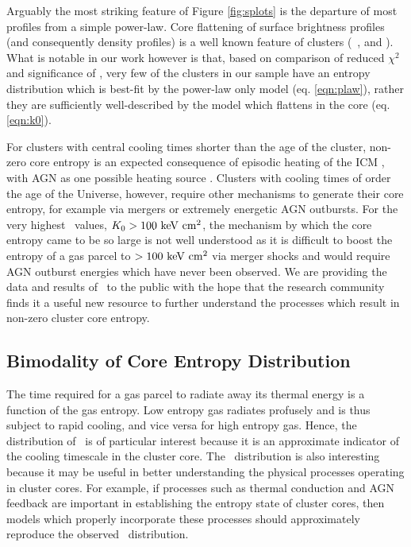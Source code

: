 \documentclass[12pt,preprint]{aastex}
\begin{document}
Arguably the most striking feature of Figure \ref{fig:splots} is the
departure of most profiles from a simple power-law. Core flattening of
surface brightness profiles (and consequently density profiles) is a
well known feature of clusters (\eg\ \citealt{1984ApJ...276...38J},
\citealt{1999ApJ...517..627M} and \citealt{2000MNRAS.318..715X}). What
is notable in our work however is that, based on comparison of reduced
$\chi^2$ and significance of \kna, very few of the clusters in our
sample have an entropy distribution which is best-fit by the power-law
only model (eq. \ref{eqn:plaw}), rather they are sufficiently
well-described by the model which flattens in the core
(eq. \ref{eqn:k0}).

For clusters with central cooling times shorter than the age of the
cluster, non-zero core entropy is an expected consequence of episodic
heating of the ICM \citep{agnframework}, with AGN as one possible
heating source \citep{1997MNRAS.288..355B, 2000ApJ...532...17L,
2001Natur.414..425V, 2001ApJ...549..832S, 2002MNRAS.332..729C,
2002Natur.418..301B, 2002MNRAS.331..545B, 2002MNRAS.333..145N,
2002ApJ...581..223R, 2002MNRAS.335..610A, 2004MNRAS.348.1105O,
2004ApJ...613..811M, 2004ApJ...615..681R, 2004ApJ...617..896H,
2004MNRAS.355..995D, 2005ApJ...622..847S, pizzolato05,
2006ApJ...643..120B, 2006ApJ...638..659M}. Clusters with cooling times
of order the age of the Universe, however, require other mechanisms to
generate their core entropy, for example via mergers or extremely
energetic AGN outbursts. For the very highest \kna\ values, $K_0 >
100 \mathrm{\mbox{\ensuremath{\mathrm{~keV}}} \mathrm{\mbox{\ensuremath{\mathrm{~cm}}}^2}}$, the mechanism by which the core entropy came to be so large
is not well understood as it is difficult to boost the entropy of a
gas parcel to $> 100 \mathrm{\mbox{\ensuremath{\mathrm{~keV}}} \mathrm{\mbox{\ensuremath{\mathrm{~cm}}}^2}}$ via merger shocks
\citep{2008MNRAS.386.1309M} and would require AGN outburst energies
which have never been observed. We are providing the data and results
of \accept\ to the public with the hope that the research community
finds it a useful new resource to further understand the processes
which result in non-zero cluster core entropy.

\subsection{Bimodality of Core Entropy Distribution}
\label{sec:bimod}

The time required for a gas parcel to radiate away its thermal energy
is a function of the gas entropy. Low entropy gas radiates profusely
and is thus subject to rapid cooling, and vice versa for high entropy
gas. Hence, the distribution of \kna\ is of particular interest
because it is an approximate indicator of the cooling timescale in the
cluster core. The \kna\ distribution is also interesting because it
may be useful in better understanding the physical processes operating
in cluster cores. For example, if processes such as thermal conduction
and AGN feedback are important in establishing the entropy state of
cluster cores, then models which properly incorporate these processes
should approximately reproduce the observed \kna\ distribution.
\end{document}
